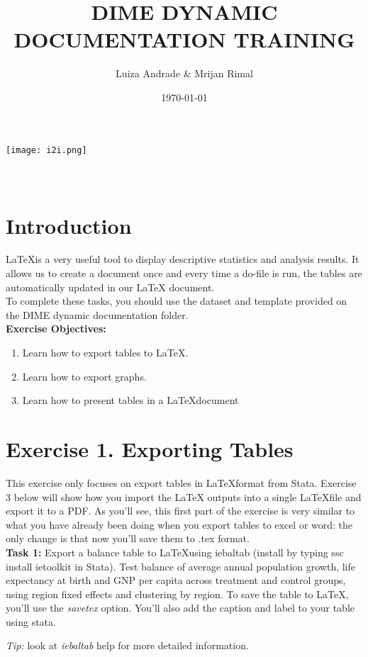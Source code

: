 \documentclass[12pts]{report}
\title{DIME DYNAMIC DOCUMENTATION TRAINING }
\author{Luiza Andrade \& Mrijan Rimal}
\date{\today}
\begin{document}
	

\makeatletter
\begin{titlepage}
	\begin{center}
		\texttt{[image: i2i.png]}\\[10ex]
		{\LARGE \bfseries  \@title }\\[2ex] 
		{\Large  \@author}\\[20ex] 
		{\large \@date}
	\end{center}
\end{titlepage}
\makeatother

\section*{Introduction}
\LaTeX\space is a very useful tool to display descriptive statistics and analysis results. It allows us to create a document once and every time a do-file is run, the tables are automatically updated in our LaTeX document. \\

To complete these tasks, you should use the dataset and template provided on the DIME dynamic documentation folder. \\

\textbf{Exercise Objectives:}
\begin{enumerate}
	\item Learn how to export tables to \LaTeX.
	\item Learn how to export graphs.
	\item Learn how to present tables in a \LaTeX document
\end{enumerate}

\section*{Exercise 1. Exporting Tables}
This exercise only focuses on export tables in \LaTeX \space format from Stata. Exercise 3 below will show how you import the LaTeX outputs into a single \LaTeX \space file and export it to a PDF. As you'll see, this first part of the exercise is very similar to what you have already been doing when you export tables to excel or word: the only change is that now you'll save them to .tex format. \\

\textbf{Task 1:}  Export a balance table to \LaTeX \space using iebaltab (install by typing ssc install ietoolkit in Stata). Test balance of average annual population growth, life expectancy at birth and GNP per capita across treatment and control groups, using region fixed effects and clustering by region. To save the table to \LaTeX, you'll use the \textit{savetex} option. You'll also add the caption and label to your table using stata. 
\begin{center}
	\colorbox{BurntOrange}{\emph{Tip:} look at \textit{iebaltab} help for more detailed information.}
\end{center}
\end{document}
